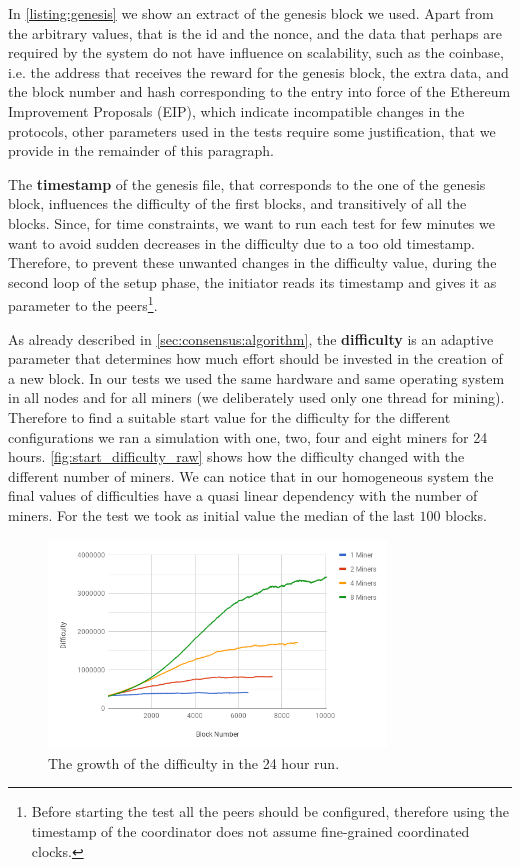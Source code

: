 In \autoref{listing:genesis} we show an extract of the genesis block we used. 
Apart from the arbitrary values, that is the id and the nonce, and the data
that perhaps are required by the system do not have influence on scalability,
such as the coinbase, i.e. the address that receives the reward for the genesis
block, the extra data, and the block number and hash corresponding to the entry
into force of the Ethereum Improvement Proposals (EIP), which indicate
incompatible changes in the protocols, other parameters used in the tests
require some justification, that we provide in the remainder of this paragraph.

The \textbf{timestamp} of the genesis file, that corresponds to the one of the
genesis block, influences the difficulty of the first blocks, and transitively
of all the blocks. Since, for time constraints, we want to run each test for few
minutes we want to avoid sudden decreases in the difficulty due to a too old
timestamp. Therefore, to prevent these unwanted changes in the difficulty value,
during the second loop of the setup phase, the initiator reads its timestamp and
gives it as parameter to the peers\footnote{Before starting the test all the
peers should be configured, therefore using the timestamp of the coordinator
does not assume fine-grained coordinated clocks.}.

As already described in \autoref{sec:consensus:algorithm}, the
\textbf{difficulty} is an adaptive parameter that determines how much effort
should be invested in the creation of a new block. In our tests we used the same
hardware and same operating system in all nodes and for all miners (we
deliberately used only one thread for mining). Therefore to find a suitable
start value for the difficulty for the different configurations we ran a
simulation with one, two, four and eight miners for 24 hours.
\autoref{fig:start_difficulty_raw} shows how the difficulty changed with the
different number of miners. We can notice that in our homogeneous system the
final values of difficulties have a quasi linear dependency with the number of
miners. For the test we took as initial value the median of the last $100$
blocks.
\begin{figure}
  \begin{center}
    \includegraphics[width=0.8\textwidth]{./res/img/start_difficulty_all.png}
    \caption{The growth of the difficulty in the 24 hour run.}
    \label{fig:start_difficulty_raw}
  \end{center}
\end{figure}

